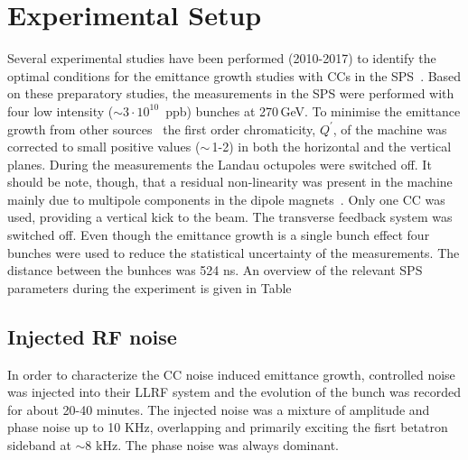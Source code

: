  \section{Experimental Setup} %

Several experimental studies have been performed (2010-2017) to identify the optimal conditions for the emittance growth studies with CCs in the SPS~\cite{Calaga:1451286, Antoniou:2649815}. Based on these preparatory studies, the measurements in the SPS were performed with four low intensity ($\sim 3 \cdot 10^{10}$\, ppb) bunches at 270\,GeV. To minimise the emittance growth from other sources~\cite{Antoniou:2649815} the first order chromaticity, $Q^\prime$, of the machine was corrected to small positive values ($\sim$\,1-2) in both the horizontal and the vertical planes. During the measurements the Landau octupoles were switched off. It should be note, though, that a residual non-linearity was present in the machine mainly due to multipole components in the dipole magnets~\cite{Carlà:2664976, Alekou:2640326}. Only one CC was used, providing a vertical kick to the beam. The transverse feedback system was switched off. Even though the emittance growth is a single bunch effect four bunches were used to reduce the statistical uncertainty of the measurements. The distance between the bunhces was 524 ns. An overview of the relevant SPS parameters during the experiment is given in Table%



 \subsection{Injected RF noise} 

 In order to characterize the CC noise induced emittance growth, controlled noise was injected into their LLRF system and the evolution of the bunch was recorded for about 20-40 minutes. The injected noise was a mixture of amplitude and phase noise up to 10 KHz, overlapping and primarily exciting the fisrt betatron sideband at $\sim 8$ kHz. The phase noise was always dominant. 